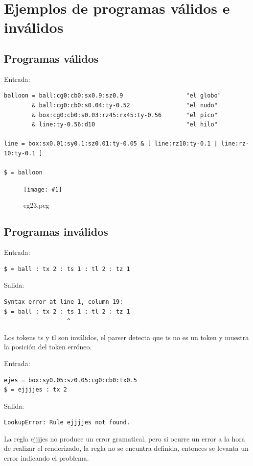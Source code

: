 \documentclass[a4paper, 10pt, twoside]{article}
\newcommand{\grafico}[3]{
  \begin{figure}[H]
  	\centering
    \texttt{[image: \#1]}
    \caption{#2}
    \label{#3}
  \end{figure}
}
\begin{document}
\section{Ejemplos de programas válidos e inválidos}

\subsection{Programas válidos}

\noindent
Entrada:

\begin{verbatim}
balloon = ball:cg0:cb0:sx0.9:sz0.9                  "el globo"
        & ball:cg0:cb0:s0.04:ty-0.52                "el nudo"
        & box:cg0:cb0:s0.03:rz45:rx45:ty-0.56       "el pico"
        & line:ty-0.56:d10                          "el hilo"

line = box:sx0.01:sy0.1:sz0.01:ty-0.05 & [ line:rz10:ty-0.1 | line:rz-10:ty-0.1 ]

$ = balloon

\end{verbatim}

\grafico{ejemplo23.png}{eg23.peg}{Ej1}


\subsection{Programas inválidos}

\noindent
Entrada:
\begin{verbatim}
$ = ball : tx 2 : ts 1 : tl 2 : tz 1
\end{verbatim}

\noindent
Salida:
\begin{verbatim}
Syntax error at line 1, column 19:
$ = ball : tx 2 : ts 1 : tl 2 : tz 1
                  ^
\end{verbatim}
Los tokens ts y tl son inválidos, el parser detecta que ts no es un token y muestra la posición del token erróneo.

\noindent
Entrada:
\begin{verbatim}
ejes = box:sy0.05:sz0.05:cg0:cb0:tx0.5
$ = ejjjjes : tx 2
\end{verbatim}

\noindent
Salida:
\begin{verbatim}
LookupError: Rule ejjjjes not found.
\end{verbatim}

La regla ejjjjes no produce un error gramatical, pero si ocurre un error a la hora de realizar el renderizado, la regla no se encuntra definida, entonces se levanta un error indicando el problema.
\end{document}
